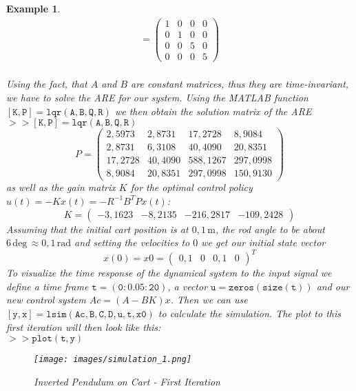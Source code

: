 \documentclass[paper=a4, pagesize, DIV=calc, BCOR=12.5mm, twoside=on, onecolumn=on, open = any, titlepage =on, parskip =half-, headsepline = on, footsepline = on, chapterprefix = on, appendixprefix = off, fontsize = 12pt, numbers = noenddot, abstract = on]{scrbook}
\numberwithin{equation}{chapter}
\theoremstyle{definition}
\theoremstyle{plain}
\newtheorem{beispiel}{Example}
\theoremstyle{plain}
\theoremstyle{remark}
\theoremstyle{plain}
\theoremstyle{plain}
\begin{document}
\begin{beispiel}
\begin{align*}
= \begin{pmatrix}
1 & 0 & 0 & 0\\
0 & 1 & 0 & 0\\
0 & 0 & 5 & 0\\
0 & 0 & 0 & 5
\end{pmatrix}
\end{align*}\\
Using the fact, that $A$ and $B$ are constant matrices, thus they are time-invariant, we have to solve the ARE for our system. Using the MATLAB function $\mathtt{[K,P]= lqr(A,B,Q,R)}$ we then obtain the solution matrix of the ARE\\
$\mathtt{>> [K,P]=lqr(A,B,Q,R)}$ 
\begin{equation*}
P = \begin{pmatrix}
    2,5973  &  2,8731  & 17,2728 &   8,9084\\
    2,8731  &  6,3108 &  40,4090 &  20,8351\\
   17,2728  & 40,4090  &588,1267&  297,0998\\
    8,9084 &  20,8351 & 297,0998 & 150,9130
\end{pmatrix}
\end{equation*}
as well as the gain matrix $K$ for the optimal control policy $u(t)=-Kx(t)=-R^{-1}B^TPx(t)$:
\begin{equation*}
K= \begin{pmatrix}
   -3,1623  & -8,2135& -216,2817& -109,2428
   \end{pmatrix}
\end{equation*}
Assuming that the initial cart position is at $0,1 \,\mathrm{m}$, the rod angle to be about $6 \, \mathrm{deg} \, \approx 0,1 \, \mathrm{rad}$ and setting the velocities to $0$ we get our initial state vector
\[
x(0) = x0 = \begin{pmatrix} 0,1& 0 &0,1&0 \end{pmatrix}^T
\]
To visualize the time response of the dynamical system to the input signal we define a time frame $\mathtt{t=(0:0.05:20)}$, a vector $\mathtt{u = zeros(size(t))}$ and our new control system $Ac = (A-BK)x$. Then we can use $\mathtt{[y,x]=lsim(Ac,B,C,D,u,t,x0)}$ to calculate the simulation. The plot to this first iteration will then look like this:\\
$\mathtt{>> plot(t,y)}$
\begin{figure}[h]
	\centering
	\begin{minipage}[c]{14cm}
		\centering
		\texttt{[image: images/simulation\_1.png]} 
		\caption{Inverted Pendulum on Cart - First Iteration}
		\label{fig: first iteration}
	\end{minipage}
\end{figure}
\par
\end{beispiel}
\end{document}
